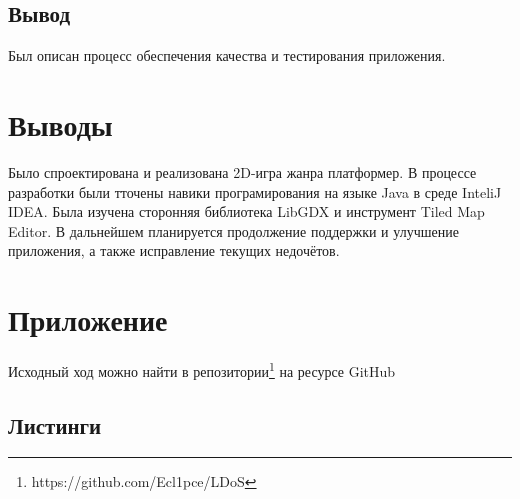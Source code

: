 \subsection{Вывод}

Был описан процесс обеспечения качества и тестирования приложения.

\section{Выводы}

Было спроектирована и реализована 2D-игра жанра платформер. В процессе разработки были тточены навики програмирования на языке Java в среде InteliJ IDEA. Была изучена сторонняя библиотека LibGDX и инструмент Tiled Map Editor. В дальнейшем планируется продолжение поддержки и улучшение приложения, а также исправление текущих недочётов.

\section{Приложение}

Исходный ход можно найти в репозитории\footnote{https://github.com/Ecl1pce/LDoS} на ресурсе GitHub

\subsection{Листинги}

 
 
 
 
 
 
  
 
 
 
 
 
 
 
 
 
 









